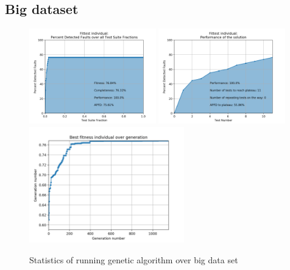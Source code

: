 \documentclass[12pt]{article}
\begin{document}
\subsection{Big dataset}

\begin{figure}[H]
  \centering
  \includegraphics[width=0.49\textwidth]{ga_big_apfd_total}
  \includegraphics[width=0.49\textwidth]{ga_big_apfd_local}
  \includegraphics[width=0.6\textwidth]{ga_big_fitness_all}
  \caption{Statistics of running genetic algorithm over big data set}
  \label{fig:ga_big}
\end{figure}
\end{document}
